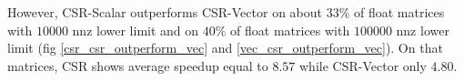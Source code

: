 \documentclass{article}
\begin{document}
\begin{figure}[H]
\centering
{}
\qquad %
\end{figure}

However, CSR-Scalar outperforms CSR-Vector on about $33\%$ of float matrices with $10000$ nnz lower limit and on $40\%$ of float matrices with $100000$ nnz lower limit 
(fig \ref{csr_csr_outperform_vec} and \ref{vec_csr_outperform_vec}). On that matrices, CSR shows average speedup equal to $8.57$ while CSR-Vector
only $4.80$. 
\end{document}
